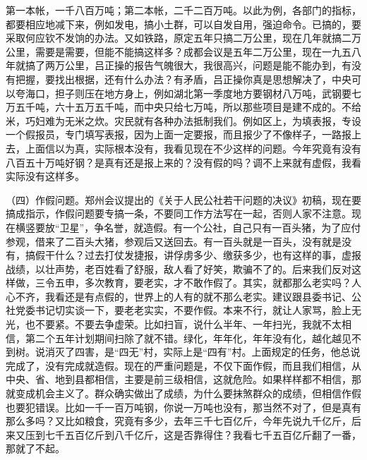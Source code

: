 第一本帐，一千八百万吨；第二本帐，二千二百万吨。以此为例，各部门的指标，都要相应地减下来，例如发电，搞小土群，可以自发自用，强迫命令。已搞的，要采取何应钦不发饷的办法。又如铁路，原定五年只搞二万公里，现在几年就搞二万公里，需要是需要，但能不能搞这样多？成都会议是五年二万公里，现在一九五八年就搞了两万公里，吕正操的报告气魄很大，我很高兴，问题是能不能办到，有没有把握，要找出根据，还有什么办法？有矛盾，吕正操你真是思想解决了，中央可以夸海口，担子则压在地方身上，例如湖北第一季度地方要钢材八万吨，武钢要七万五千吨，六十五万五千吨，而中央只给七万吨，所以那些项目是建不成的。不给米，巧妇难为无米之炊。灾民就有各种办法抵制我们。例如区上，为填表报，专设一个假报员，专门填写表报，因为上面一定要报，而且报少了不像样子，一路报上去，上面信以为真，实际根本没有，我看见现在不少这样的问题。今年究竟有没有八百五十万吨好钢？是真有还是报上来的？没有假的吗？调不上来就有虚假，我看实际没有这样多。

（四）作假问题。郑州会议提出的《关于人民公社若干问题的决议》初稿，现在要搞成指示，作假问题要专搞一条，不要同工作方法写在一起，否则人家不注意。现在横竖要放“卫星”，争名誉，就造假。有一个公社，自己只有一百头猪，为了应付参观，借来了二百头大猪，参观后又送回去。有一百头就是一百头，没有就是没有，搞假干什么？过去打仗发捷报，讲俘虏多少、缴获多少，也有这样的事，虚报战绩，以壮声势，老百姓看了舒服，敌人看了好笑，欺骗不了的。后来我们反对这样做，三令五申，多次教育，要老实，才不敢作假了。其实，就都那么老实吗？人心不齐，我看还是有点假的，世界上的人有的就不那么老实。建议跟县委书记、公社党委书记切实谈一下，要老老实实，不要作假。本来不行，就让人家骂，脸上无光，也不要紧。不要去争虚荣。比如扫盲，说什么半年、一年扫光，我就不太相信，第二个五年计划期间扫除了就不错。绿化，年年化，年年没有化，越化越见不到树。说消灭了四害，是“四无”村，实际上是“四有”村。上面规定的任务，他总说完成了，没有完成就造假。现在的严重问题是，不仅下面作假，而且我们相信，从中央、省、地到县都相信，主要是前三级相信，这就危险。如果样样都不相信，那就变成机会主义了。群众确实做出了成绩，为什么要抹煞群众的成绩，但相信作假也要犯错误。比如一千一百万吨钢，你说一万吨也没有，那当然不对了，但是真有那么多吗？又比如粮食，究竟有多少，去年三千七百亿斤，今年先说九千亿斤，后来又压到七千五百亿斤到八千亿斤，这是否靠得住？我看七千五百亿斤翻了一番，那就了不起。

